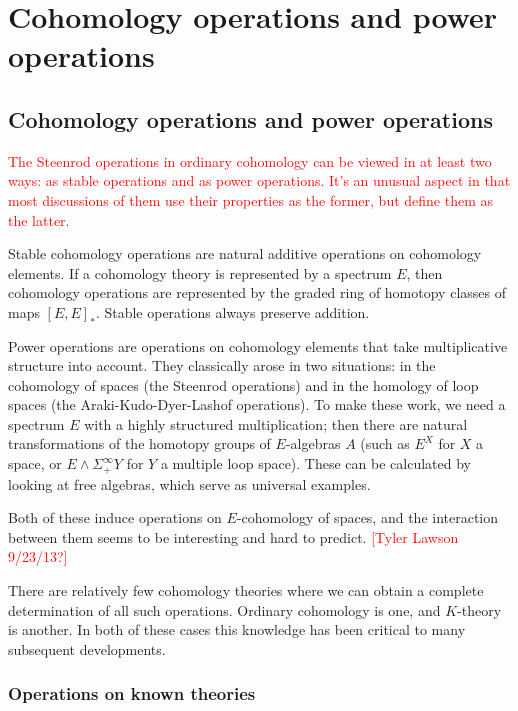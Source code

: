 \documentclass[12pt,titlepage]{article}
\newcommand{\rd}[1]{{\textcolor{red}{#1}}}
\theoremstyle{plain}
\theoremstyle{definition}
\theoremstyle{remark}
\begin{document}

\section{Cohomology operations and power operations}

\hypertarget{cohomology_operations_and_power_operations_1}{}\subsection{{Cohomology operations and power operations}}\label{cohomology_operations_and_power_operations_1}

\rd{The Steenrod operations in ordinary cohomology can be viewed in at least two ways: as stable operations and as power operations. It'{}s an unusual aspect in that most discussions of them use their properties as the former, but define them as the latter.}

Stable cohomology operations are natural additive operations on cohomology elements. If a cohomology theory is represented by a spectrum $E$, then cohomology operations are represented by the graded ring of homotopy classes of maps $[E, E]_*$. Stable operations always preserve addition.

Power operations are operations on cohomology elements that take multiplicative structure into account. They classically arose in two situations: in the cohomology of spaces (the Steenrod operations) and in the homology of loop spaces (the Araki-Kudo-Dyer-Lashof operations). To make these work, we need a spectrum $E$ with a highly structured multiplication; then there are natural transformations of the homotopy groups of $E$-algebras $A$ (such as $E^X$ for $X$ a space, or $E \wedge \Sigma^\infty_+ Y$ for $Y$ a multiple loop space). These can be calculated by looking at free algebras, which serve as universal examples.

Both of these induce operations on $E$-cohomology of spaces, and the interaction between them seems to be interesting and hard to predict. \rd{[Tyler Lawson 9/23/13?]}

There are relatively few cohomology theories where we can obtain a complete determination of all such operations. Ordinary cohomology is one, and $K$-theory is another. In both of these cases this knowledge has been critical to many subsequent developments.

\hypertarget{operations_on_known_theories_2}{}\subsubsection{{Operations on known theories}}\label{operations_on_known_theories_2}
\end{document}
